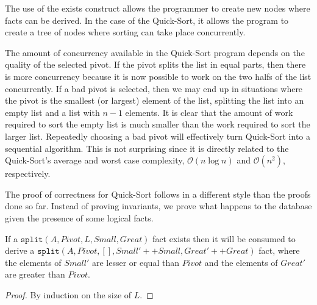 The use of the exists construct allows the programmer to create new nodes
where facts can be derived. In the case of the Quick-Sort, it allows the program
to create a tree of nodes where sorting can take place concurrently.

The amount of concurrency available in the Quick-Sort program depends on the
quality of the selected pivot. If the pivot splits the list in equal parts, then
there is more concurrency because it is now possible to work on the two halfs of
the list concurrently. If a bad pivot is selected, then we may end up in
situations where the pivot is the smallest (or largest) element of the list,
splitting the list into an empty list and a list with $n-1$ elements. It is
clear that the amount of work required to sort the empty list is much smaller than
the work required to sort the larger list.  Repeatedly choosing a bad pivot will
effectively turn Quick-Sort into a sequential algorithm. This is not surprising
since it is directly related to the Quick-Sort's average and worst case
complexity, $\mathcal{O}(n \log{n})$ and $\mathcal{O}(n^2)$, respectively.

The proof of correctness for Quick-Sort follows in a different style than the
proofs done so far. Instead of proving invariants, we prove what happens to the
database given the presence of some logical facts.

\begin{lemma}

If a $\mathtt{split}(A, Pivot, L, Small, Great)$ fact exists then it will be
consumed to derive a $\mathtt{split}(A, Pivot, [], Small' ++ Small, Great' ++
Great)$ fact, where the elements of $Small'$ are lesser or equal than $Pivot$
and the elements of $Great'$ are greater than $Pivot$.

\end{lemma}
\begin{proof}
By induction on the size of $L$.
\end{proof}

